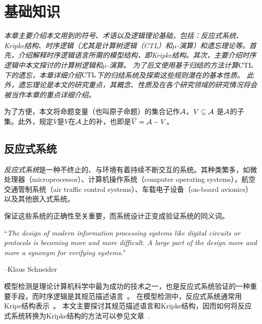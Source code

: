 \chapter{基础知识}\label{chapter02}

{\em 本章主要介绍本文用到的符号、术语以及逻辑理论基础，包括：反应式系统、Kripke结构、时序逻辑（尤其是计算树逻辑（CTL）和$\mu$-演算）和遗忘理论等。首先，介绍解释时序逻辑语言所需的模型结构，即Kripke结构。其次，主要介绍时序逻辑中本文探讨的计算树逻辑和$\mu$-演算。
	为了后文使用基于归结的方法计算$\textrm{CTL}$下的遗忘，本章详细介绍$\textrm{CTL}$下的归结系统及探索这些规则潜在的基本性质。
	此外，遗忘理论是本文的研究重点，其概念、性质及在各个研究领域的研究情况将会被当作本章的重点详细介绍。

为了方便，本文将命题变量（也叫原子命题）的集合记作$\cal A$，$V\subseteq {\cal A}$ 是$\cal A$的子集。此外，规定$\overline{V}$是$V$在${\cal A}$上的补，也即是$\overline{V}={\cal A}-V$。}

\section{反应式系统}
{\em 反应式系统}是一种不终止的、与环境有着持续不断交互的系统。其种类繁多，如微处理器（microprocessor）、计算机操作系统（computer operating systems），航空交通管制系统（air traffic control systems）、车载电子设备（on-board avionics）以及其他嵌入式系统。

保证这些系统的正确性至关重要，而系统设计正变成验证系统的同义词。

``{\em The design of modern information processing systems like digital circuits or 
	protocols is becoming more and more difficult. A large part of the design 
	more and more a synonym for verifying systems.}"  

\hfill   --Klaus Schneider

模型检测是理论计算机科学中最为成功的技术之一，也是反应式系统验证的一种重要手段，而时序逻辑是其规范描述语言~\cite{DBLP:books/sp/trends86/Pnueli86}。
在模型检测中，反应式系统通常用Kripe结构表示~\cite{DBLP:journals/fcsc/ZhuWXX10,DBLP:series/txtcs/Schneider04}。
本文主要探讨其规范描述语言和Kripke结构，因而如何将反应式系统转换为Kripke结构的方法可以参见文章~\cite{schneider2000verified,DBLP:conf/acsd/Schneider01,DBLP:conf/tphol/Schneider02}.

